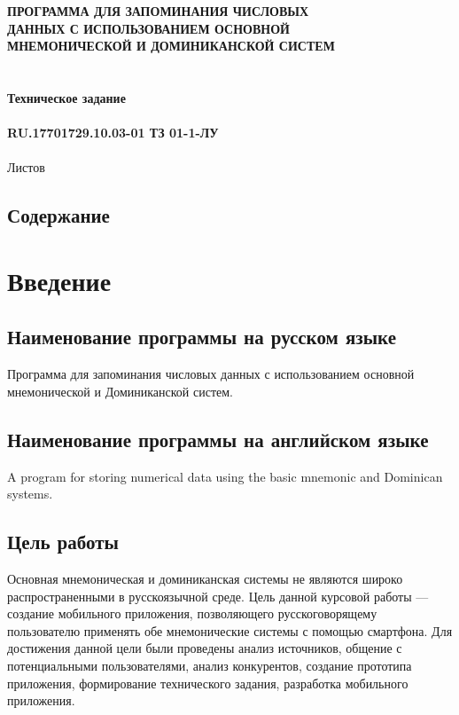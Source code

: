 \documentclass[draft]{article}
\begin{document}
\bigskip
\begin{center}
\topskip=0pt
\vspace*{\fill}
\textbf{ПРОГРАММА ДЛЯ ЗАПОМИНАНИЯ ЧИСЛОВЫХ\\
 ДАННЫХ С ИСПОЛЬЗОВАНИЕМ ОСНОВНОЙ\\
 МНЕМОНИЧЕСКОЙ И ДОМИНИКАНСКОЙ СИСТЕМ\\
~\\
~\\
Техническое задание\\
~\\
RU.17701729.10.03-01 ТЗ 01-1-ЛУ}\\
~\\
Листов \ztotpages\\
\vspace*{\fill}
\end{center}
\begin{center}
\vspace*{\fill}{
  Москва 2022}
\end{center}
\newpage
\begin{center}
\section {Содержание}
\tableofcontents
\end{center}
\newpage
\section {Введение}
\subsection{Наименование программы на русском языке}
Программа для запоминания числовых данных с использованием основной мнемонической и Доминиканской систем.
\subsection{Наименование программы на английском языке}
A program for storing numerical data using the basic mnemonic and Dominican systems.
\subsection{Цель работы}
Основная мнемоническая и доминиканская системы не являются широко распространенными в русскоязычной среде. Цель данной курсовой работы — создание мобильного приложения, позволяющего русскоговорящему пользователю применять обе мнемонические системы с помощью смартфона. Для достижения данной цели были проведены анализ источников, общение с потенциальными пользователями, анализ конкурентов, создание прототипа приложения, формирование технического задания, разработка мобильного приложения.
\end{document}
